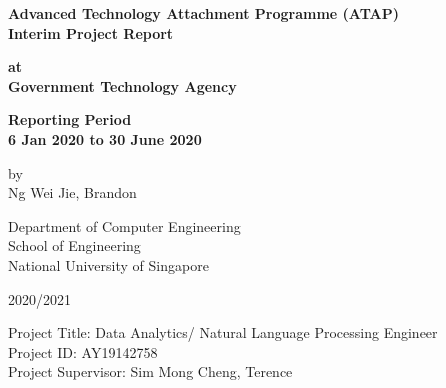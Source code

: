 \begin{titlepage}
	\begin{center}
		\vspace*{20px}
		\large\textbf{Advanced Technology Attachment Programme (ATAP)}\\
		\large\textbf{Interim Project Report}
		
		\vspace*{50px}
		\large\textbf{at}\\
		\large\textbf{Government Technology Agency}
		
		\vspace*{20px}
		\large\textbf{Reporting Period}\\
		\large\textbf{6 Jan 2020 to 30 June 2020}
		
		\vspace*{20px}
		\large{by}\\
		\large{Ng Wei Jie, Brandon}
		
		\vspace*{20px}
		\large{Department of Computer Engineering}\\
		\large{School of Engineering}\\
		\large{National University of Singapore}
		
		\vspace*{20px}
		\large{2020/2021}
	\end{center}

	\begin{large}
		\vspace*{50px}
		\noindent 
		Project Title: Data Analytics/ Natural Language Processing Engineer\\
		Project ID: AY19142758\\
		Project Supervisor: Sim Mong Cheng, Terence\\
	\end{large}
\end{titlepage}